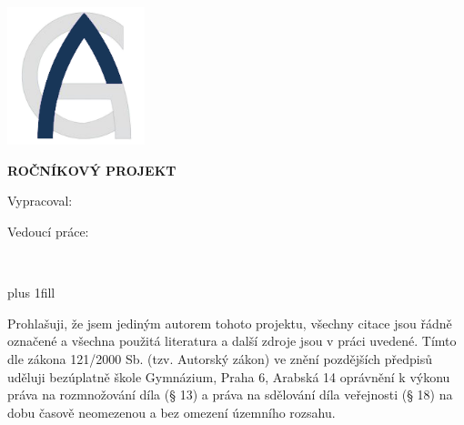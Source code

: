 


\pagestyle{empty}
\hypersetup{pageanchor=false}

\begin{center}

{\LARGE\bfseries\NazevSkoly}

\vspace{-18mm}
\vfill

{\LARGE\NazevOboru}

\vfill

\centerline{\mbox{\includegraphics[height=4cm]{../img/logo.png}}}

\vspace{-8mm}
\vfill

{\bf\Large ROČNÍKOVÝ PROJEKT}

\vfill


\vspace{15mm}

{\LARGE\bfseries\NazevPrace}


\vfill


Vypracoval: \hfill {\AutorPrace}

Vedoucí práce: \hfill {\Vedouci}

\vspace{15mm}
\MesicOdevzdani \ \RokOdevzdani

\end{center}



\newpage



\openright

\hypersetup{pageanchor=true}
\pagestyle{plain}
\vglue 0pt plus 1fill

\medskip\noindent
Prohlašuji, že jsem jediným autorem tohoto projektu, všechny citace jsou
řádně označené a všechna použitá literatura a další zdroje jsou v práci uvedené.
Tímto dle zákona 121/2000 Sb. (tzv. Autorský zákon) ve znění pozdějších předpisů uděluji
bezúplatně škole Gymnázium, Praha 6, Arabská 14 oprávnění k výkonu práva na rozmnožování díla
(§ 13) a práva na sdělování díla veřejnosti (§ 18) na dobu časově neomezenou a bez omezení
územního rozsahu.

